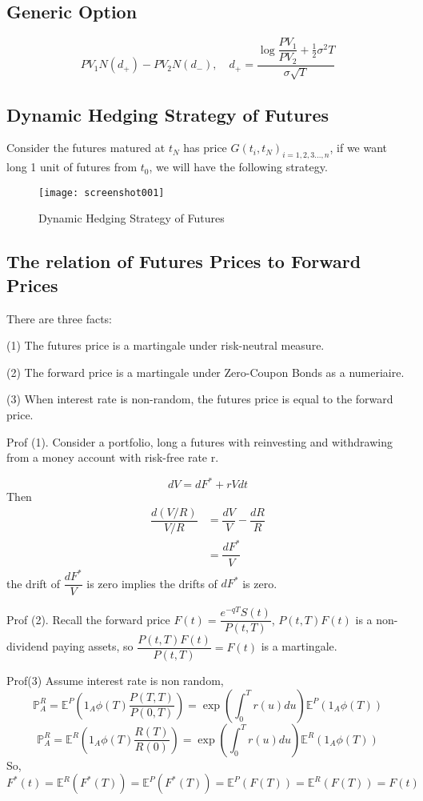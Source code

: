\documentclass[a4]{article}
\begin{document}
\subsection{Generic Option}
$$
PV_{1}N(d_{+}) - PV_{2}N(d_{-}), \quad d_{+} = \dfrac{\log \dfrac{PV_{1}}{PV_{2}}+\frac{1}{2}\sigma^{2}T }{\sigma\sqrt{T}}
$$

\subsection{Dynamic Hedging Strategy of Futures}
Consider the futures matured at $t_{N}$ has price $G(t_{i}, t_{N})_{i=1,2,3...,n}$, if we want long 1 unit of futures from $t_{0}$, we will have the following strategy.\par 
\begin{figure}
	\centering
	\texttt{[image: screenshot001]}
	\caption{Dynamic Hedging Strategy of Futures}
	\label{fig:screenshot001}
\end{figure}

\subsection{The relation of Futures Prices to Forward Prices}
 There are three facts:\par 
 \bigbreak 
 (1) The futures price is a martingale under risk-neutral measure.\par 
 (2) The forward price is a martingale under Zero-Coupon Bonds as a numeriaire.\par 
 (3) When interest rate is non-random, the futures price is equal to the forward price.\par 
 \bigbreak 
 Prof (1). Consider a portfolio, long a futures with reinvesting and withdrawing from a money account with risk-free rate r.\par 
 $$
dV = dF^{*} + rVdt
 $$ 
 Then $$
 \begin{aligned}
 \dfrac{d(V/R)}{V/R} &= \dfrac{dV}{V} - \dfrac{dR}{R} \\
 &=\dfrac{dF^{*}}{V}
 \end{aligned}
 $$
 the drift of $\dfrac{dF^{*}}{V} $ is zero implies the drifts of $dF^{*}$ is zero. \par 
 \bigbreak 
 Prof (2). Recall the forward price $F(t) = \dfrac{e^{-qT}S(t)}{P(t, T)} $, $P(t, T)F(t)$ is a non-dividend paying assets, so $\dfrac{P(t,T)F(t)}{P(t,T)} = F(t)$ is a martingale.\par 
 \bigbreak 
 Prof(3) Assume interest rate is non random,
 $$
\mathbb{P}^{R}_{A} = \mathbb{E}^{P}(1_{A}\phi(T)\dfrac{P(T,T)}{P(0, T)}) = \exp(\int^{T}_{0}r(u)du)\mathbb{E}^{P}(1_{A}\phi(T))
 $$
 $$
\mathbb{P}^{R}_{A} = \mathbb{E}^{R}(1_{A}\phi(T)\dfrac{R(T)}{R(0)}) = \exp(\int^{T}_{0}r(u)du)\mathbb{E}^{R}(1_{A}\phi(T))
 $$
 So,
 $$
F^{*}(t) = \mathbb{E}^{R}(F^{*}(T)) =  \mathbb{E}^{P}(F^{*}(T)) = \mathbb{E}^{P}(F(T)) = \mathbb{E}^{R}(F(T)) = F(t)
 $$
\end{document}

